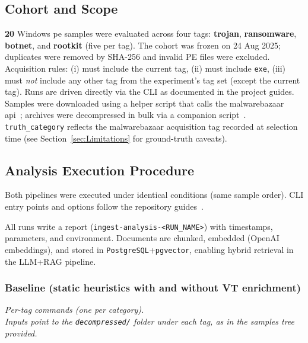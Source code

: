 \subsection{Cohort and Scope}\label{subsec:CohortScope}
\textbf{20} Windows \gls{pe} samples were evaluated across four tags: \textbf{trojan}, \textbf{ransomware},
\textbf{botnet}, and \textbf{rootkit} (five per tag). The cohort was frozen on 24 Aug 2025;
duplicates were removed by SHA-256 and invalid PE files were excluded. Acquisition rules: (i) must
include the current tag, (ii) must include \texttt{exe}, (iii) must \emph{not} include any other
tag from the experiment’s tag set (except the current tag). Runs are driven directly via the CLI as
documented in the project guides. Samples were downloaded using a helper script that calls the
\gls{malwarebazaar} \gls{api}~\cite{rexisSamplesExtractorScript};
archives were decompressed in bulk via a companion script~\cite{rexisDecompressSamplesScript}.
\texttt{truth\_category} reflects the \gls{malwarebazaar} acquisition tag recorded at selection time
(see Section~\ref{sec:Limitations} for ground-truth caveats).

\subsection{Analysis Execution Procedure}\label{subsec:ExecutionProcedure}
Both pipelines were executed under identical conditions (same sample order). CLI entry points and
options follow the repository guides~\cite{rexisBaselinePipeline,rexisLLMRagPipeline}.

All runs write a report (\texttt{ingest-analysis-\textless RUN\_NAME\textgreater{}}) with
timestamps, parameters, and environment. Documents are chunked, embedded (OpenAI embeddings), and
stored in \texttt{PostgreSQL}+\texttt{pgvector}, enabling hybrid retrieval in the LLM+RAG pipeline.

\subsubsection{Baseline (static heuristics with and without VT enrichment)}\label{subsubsec:BaselineExecution}
\noindent\textit{Per-tag commands (one per category).}\\ \noindent\textit{Inputs point to
      the \texttt{decompressed/} folder under each tag, as in the samples tree provided.}

